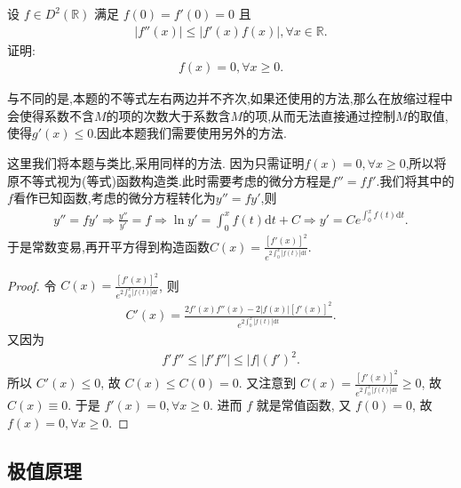 \documentclass[../../main.tex]{subfiles}
\begin{document}
\begin{example}
设 $f\in D^2(\mathbb{R})$ 满足 $f(0)=f'(0)=0$ 且
\begin{align*}
|f''(x)|\leqslant|f'(x)f(x)|,\forall x\in\mathbb{R}.
\end{align*}
证明:
\begin{align*}
f(x)=0,\forall x\geqslant 0.
\end{align*} 
\end{example}
\begin{remark}
与不同的是,本题的不等式左右两边并不齐次,如果还使用的方法,那么在放缩过程中会使得系数不含$M$的项的次数大于系数含$M$的项,从而无法直接通过控制$M$的取值,使得$g'(x)\leqslant 0$.因此本题我们需要使用另外的方法.

这里我们将本题与类比,采用同样的方法. 因为只需证明$f(x)=0,\forall x\geqslant 0$,所以将原不等式视为(等式)函数构造类.此时需要考虑的微分方程是$f''=ff'$.我们将其中的$f$看作已知函数,考虑的微分方程转化为$y''=fy'$,则
\begin{align*}
y'' =fy' \Rightarrow \frac{y''}{y'}=f\Rightarrow \ln y' =\int_0^x{f\left( t \right) \mathrm{d}t}+C\Rightarrow y' =Ce^{\int_0^x{f\left( t \right) \mathrm{d}t}}.
\end{align*}
于是常数变易,再开平方得到构造函数$C\left( x \right) =\frac{\left[ f'\left( x \right) \right] ^2}{e^{2\int_0^x{|f\left( t \right)| \mathrm{d}t}}}.$
\end{remark}
\begin{proof}
令 $C(x)=\frac{[f'(x)]^2}{e^{2\int_0^x{|f(t)|\mathrm{d}t}}}$, 则
\begin{align*}
C'(x)=\frac{2f'(x)f''(x)-2|f(x)|[f'(x)]^2}{e^{2\int_0^x{|f(t)|\mathrm{d}t}}}.
\end{align*}
又因为
\begin{align*}
f'f''\leqslant|f'f''|\leqslant|f|(f')^2.
\end{align*}
所以 $C'(x)\leqslant0$, 故 $C(x)\leqslant C(0)=0$. 又注意到 $C(x)=\frac{[f'(x)]^2}{e^{2\int_0^x{|f(t)|\mathrm{d}t}}}\geqslant0$, 故 $C(x)\equiv0$. 于是 $f'(x)=0,\forall x\geqslant0$.
进而 $f$ 就是常值函数, 又 $f(0)=0$, 故 $f(x)=0,\forall x\geqslant0$. 

\end{proof}


\subsection{极值原理}
\end{document}
